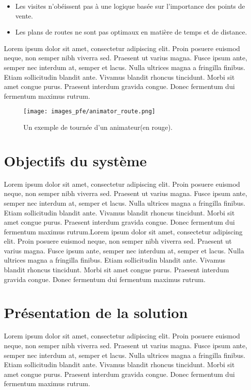 \begin{itemize}
  \item Les visites n'obéissent pas à une logique basée sur l'importance des points de vente.
  \item Les plans de routes ne sont pas optimaux en matière de temps et de distance.
\end{itemize}

\medskip

Lorem ipsum dolor sit amet, consectetur adipiscing elit. Proin posuere euismod neque, non semper nibh viverra sed. Praesent ut varius magna. Fusce ipsum ante, semper nec interdum at, semper et lacus. Nulla ultrices magna a fringilla finibus. Etiam sollicitudin blandit ante. Vivamus blandit rhoncus tincidunt. Morbi sit amet congue purus. Praesent interdum gravida congue. Donec fermentum dui fermentum maximus rutrum.

\begin{figure}[hbt!]
  \centering
  \texttt{[image: images\_pfe/animator\_route.png]}
  \caption{Un exemple de tournée d'un animateur(en rouge).}
  \label{fig:tournee-animateur-example}
\end{figure}
\FloatBarrier

\section{Objectifs du système}
Lorem ipsum dolor sit amet, consectetur adipiscing elit. Proin posuere euismod neque, non semper nibh viverra sed. Praesent ut varius magna. Fusce ipsum ante, semper nec interdum at, semper et lacus. Nulla ultrices magna a fringilla finibus. Etiam sollicitudin blandit ante. Vivamus blandit rhoncus tincidunt. Morbi sit amet congue purus. Praesent interdum gravida congue. Donec fermentum dui fermentum maximus rutrum.Lorem ipsum dolor sit amet, consectetur adipiscing elit. Proin posuere euismod neque, non semper nibh viverra sed. Praesent ut varius magna. Fusce ipsum ante, semper nec interdum at, semper et lacus. Nulla ultrices magna a fringilla finibus. Etiam sollicitudin blandit ante. Vivamus blandit rhoncus tincidunt. Morbi sit amet congue purus. Praesent interdum gravida congue. Donec fermentum dui fermentum maximus rutrum.

\section{Présentation de la solution}
Lorem ipsum dolor sit amet, consectetur adipiscing elit. Proin posuere euismod neque, non semper nibh viverra sed. Praesent ut varius magna. Fusce ipsum ante, semper nec interdum at, semper et lacus. Nulla ultrices magna a fringilla finibus. Etiam sollicitudin blandit ante. Vivamus blandit rhoncus tincidunt. Morbi sit amet congue purus. Praesent interdum gravida congue. Donec fermentum dui fermentum maximus rutrum.

